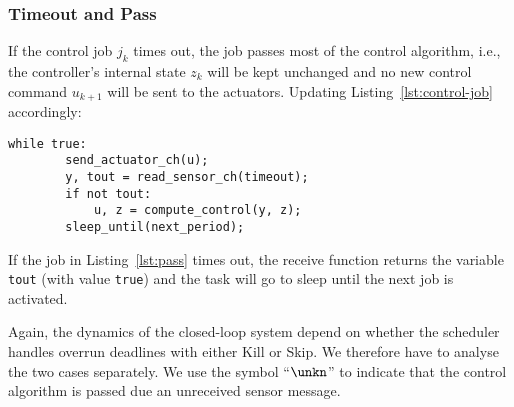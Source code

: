 \subsubsection{Timeout and Pass}%
\label{sec:blocking}%
%
If the control job $j_k$ times out, the job passes most of the control algorithm, i.e., the controller's internal state $z_k$ will be kept unchanged and no new control command $u_{k+1}$ will be sent to the actuators.
Updating Listing~\ref{lst:control-job} accordingly:
%
\begin{lstlisting}[label=lst:pass,caption={\note{Needs to be discussed - specifically actuate(u)} Timeout and Pass control code execution.}]
    while true:
        send_actuator_ch(u);
        y, tout = read_sensor_ch(timeout);
        if not tout:
            u, z = compute_control(y, z);
        sleep_until(next_period);
\end{lstlisting}
%
If the job in Listing~\ref{lst:pass} times out, the receive function returns the variable \texttt{tout} (with value \texttt{true}) and the task will go to sleep until the next job is activated.

Again, the dynamics of the closed-loop system depend on whether the scheduler handles overrun deadlines with either Kill or Skip. 
We therefore have to analyse the two cases separately.
We use the symbol ``$\unkn$'' to indicate that the control algorithm is passed due an unreceived sensor message.


